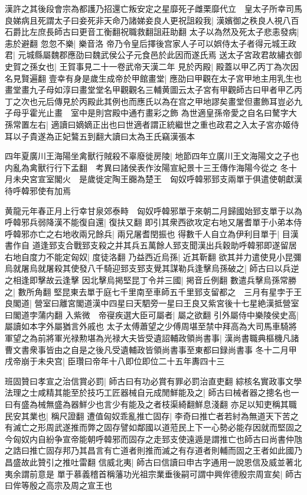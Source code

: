 漢許之其後段會宗為都護乃招還亡叛安定之星靡死子雌栗靡代立　皇太子所幸司馬良娣病且死謂太子曰妾死非天命乃諸娣妾良人更祝詛殺我|{
	漢嬪御之秩良人視八百石爵比左庶長師古曰更音工衡翻祝職救翻詛莊助翻}
太子以為然及死太子悲恚發病|{
	恚於避翻}
忽忽不樂|{
	樂音洛}
帝乃令皇后擇後宫家人子可以娯侍太子者得元城王政君|{
	元城縣屬魏郡應劭曰魏武侯公子元食邑於此因而遂氏焉}
送太子宮政君故繡衣御史賀之孫女也|{
	王賀事見二十一卷武帝天漢二年}
見於丙殿|{
	殿蓋以甲乙丙丁為次因名見賢遍翻}
壹幸有身是歲生成帝於甲館畫堂|{
	應劭曰甲觀在太子宮甲地主用乳生也畫堂畫九子母如淳曰畫堂堂名甲觀觀名三輔黄圖云太子宮有甲觀師古曰甲者甲乙丙丁之次也元后傳見於丙殿此其例也而應氏以為在宫之甲地謬矣畫堂但畫飾耳豈必九子母乎霍光止畫　室中是則宫殿中通冇畫彩之飾}
為世適皇孫帝愛之自名曰驁字大孫常置左右|{
	適讀曰嫡嫡正出也曰世適者謂正統繼世之重也政君之入太子宮亦姬侍耳以子貴遂為正妃鷔五到翻大讀曰太為王氏竊漢張本}


四年夏廣川王海陽坐禽獸行賊殺不辜廢徙房陵|{
	地節四年立廣川王文海陽文之子也内亂為禽獸行行下孟翻　考異曰諸侯表作汝陽宣紀景十三王傳作海陽今從之}
冬十月未央宮宣室閣火　是歲徙定陶王嚻為楚王　匈奴呼韓邪郅支兩單于俱遣使朝獻漢待呼韓邪使有加焉

黄龍元年春正月上行幸甘泉郊泰畤　匈奴呼韓邪單于來朝二月歸國始郅支單于以為呼韓邪兵弱降漢不能復自還|{
	復扶又翻}
即引其衆西欲攻定右地又屠耆單于小弟本侍呼韓邪亦亡之右地收兩兄餘兵|{
	兩兄屠耆閏振也}
得數千人自立為伊利目單于|{
	目漢書作自}
道逢郅支合戰郅支殺之并其兵五萬餘人郅支聞漢出兵穀助呼韓邪即遂留居右地自度力不能定匈奴|{
	度徒洛翻}
乃益西近烏孫|{
	近其靳翻}
欲其并力遣使見小昆彌烏就屠烏就屠殺其使發八千騎迎郅支郅支覺其謀勒兵逢擊烏孫破之|{
	師古曰以兵逆之相逢即擊故云逢擊}
因北擊烏掲堅昆丁令并三國|{
	掲音丘例翻}
數遣兵擊烏孫常勝之|{
	數所角翻}
堅昆東去單于庭七千里南至車師五千里郅支留都之　三月有星孛于王良閣道|{
	營室曰離宮閣道漢中四星曰天駟旁一星曰王良又紫宮後十七星絶漢抵營室曰閣道孛蒲内翻}
入紫微　帝寑疾選大臣可屬者|{
	屬之欲翻}
引外屬侍中樂陵侯史高|{
	屬讀如本字外屬猶言外戚也}
太子太傅蕭望之少傅周堪至禁中拜高為大司馬車騎將軍望之為前將軍光禄勲堪為光禄大夫皆受遺詔輔政領尚書事|{
	漢尚書職典樞機凡諸曹文書衆事皆由之自是之後凡受遺輔政皆領尚書事至東都曰録尚書事}
冬十二月甲戌帝崩于未央宫|{
	臣瓚曰帝年十八即位即位二十五年夀四十三}


班固贊曰孝宣之治信賞必罰|{
	師古曰有功必賞有罪必罰治直吏翻}
綜核名實政事文學法理之士咸精其能至於技巧工匠器械自元成閒鮮能及之|{
	師古曰械者器之摠名也一曰有盛為械無盛為器鮮少也言少有能及之者枝渠綺翻鮮息淺翻}
亦足以知吏稱其職民安其業也|{
	稱尺證翻}
遭值匈奴乖亂推亡固存|{
	李奇曰推亡者若紂為無道天下苦之有滅亡之形周武遂推而弊之固存譬如鄰國以道蒞民上下一心勢必能存因就而堅固之今匈奴内自紛争宣帝能朝呼韓邪而固存之走郅支使遠遁是謂推亡也師古曰尚書仲虺之誥曰推亡固存邦乃其昌言有亡道者則推而滅之有存道者則輔而固之王者如此國乃昌盛故此贊引之推吐雷翻}
信威北夷|{
	師古曰信讀曰申古字通用一說恩信及威並著北夷余謂前意是}
單于慕義稽首稱藩功光祖宗業垂後嗣可謂中興侔德殷宗周宣矣|{
	師古曰侔等殷之高宗及周之宣王也}


